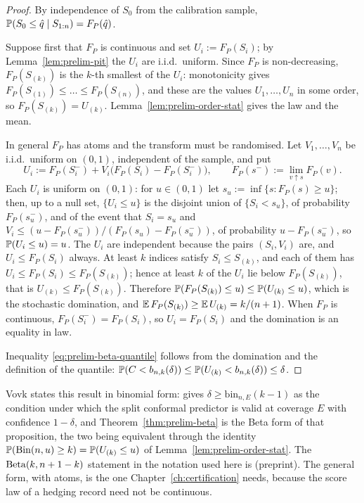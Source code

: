 \documentclass[../../../main.tex]{subfiles}
\begin{document}
\begin{proof}
By independence of $S_0$ from the calibration sample, $\mathbb{P}(S_0\le\hat q\mid S_{1:n})=F_P(\hat q)$.

Suppose first that $F_P$ is continuous and set $U_i:=F_P(S_i)$; by Lemma~\ref{lem:prelim-pit} the $U_i$ are i.i.d.\ uniform. Since $F_P$ is non-decreasing, $F_P(S_{(k)})$ is the $k$-th smallest of the $U_i$: monotonicity gives $F_P(S_{(1)})\le\dots\le F_P(S_{(n)})$, and these are the values $U_1,\dots,U_n$ in some order, so $F_P(S_{(k)})=U_{(k)}$. Lemma~\ref{lem:prelim-order-stat} gives the law and the mean.

In general $F_P$ has atoms and the transform must be randomised. Let $V_1,\dots,V_n$ be i.i.d.\ uniform on $(0,1)$, independent of the sample, and put
\[
U_i:=F_P(S_i^-)+V_i\big(F_P(S_i)-F_P(S_i^-)\big),\qquad F_P(s^-):=\lim_{v\uparrow s}F_P(v).
\]
Each $U_i$ is uniform on $(0,1)$: for $u\in(0,1)$ let $s_u:=\inf\{s:F_P(s)\ge u\}$; then, up to a null set, $\{U_i\le u\}$ is the disjoint union of $\{S_i<s_u\}$, of probability $F_P(s_u^-)$, and of the event that $S_i=s_u$ and $V_i\le(u-F_P(s_u^-))/(F_P(s_u)-F_P(s_u^-))$, of probability $u-F_P(s_u^-)$, so $\mathbb{P}(U_i\le u)=u$. The $U_i$ are independent because the pairs $(S_i,V_i)$ are, and $U_i\le F_P(S_i)$ always. At least $k$ indices satisfy $S_i\le S_{(k)}$, and each of them has $U_i\le F_P(S_i)\le F_P(S_{(k)})$; hence at least $k$ of the $U_i$ lie below $F_P(S_{(k)})$, that is $U_{(k)}\le F_P(S_{(k)})$. Therefore $\mathbb{P}(F_P(S_{(k)})\le u)\le\mathbb{P}(U_{(k)}\le u)$, which is the stochastic domination, and $\mathbb{E}\,F_P(S_{(k)})\ge\mathbb{E}\,U_{(k)}=k/(n+1)$. When $F_P$ is continuous, $F_P(S_i^-)=F_P(S_i)$, so $U_i=F_P(S_i)$ and the domination is an equality in law.

Inequality \eqref{eq:prelim-beta-quantile} follows from the domination and the definition of the quantile: $\mathbb{P}(C<b_{n,k}(\delta))\le\mathbb{P}(U_{(k)}<b_{n,k}(\delta))\le\delta$.
\end{proof}

Vovk states this result in binomial form: \cite[Prop.~2b, p.~479]{vovk2012} gives $\delta\ge\mathrm{bin}_{n,E}(k-1)$ as the condition under which the split conformal predictor is valid at coverage $E$ with confidence $1-\delta$, and Theorem~\ref{thm:prelim-beta} is the Beta form of that proposition, the two being equivalent through the identity $\mathbb{P}(\mathrm{Bin}(n,u)\ge k)=\mathbb{P}(U_{(k)}\le u)$ of Lemma~\ref{lem:prelim-order-stat}. The $\operatorname{Beta}(k,n+1-k)$ statement in the notation used here is \cite[eq.~(4)]{zwart2025} (preprint). The general form, with atoms, is the one Chapter~\ref{ch:certification} needs, because the score law of a hedging record need not be continuous.
\end{document}
